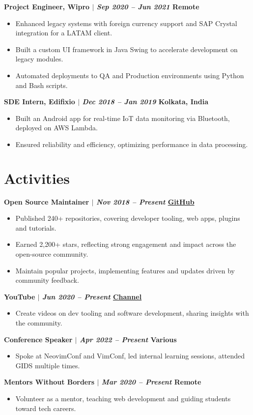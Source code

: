 \documentclass[11pt]{article} %
\newcommand{\uthree}[4]{
    {\large
        {\bfseries #1 $|$ \textit{#2} \hfill #3} \par
    }
    \begin{itemize}
        #4
    \end{itemize}
    \par\addvspace{2.5ex}%
}
\begin{document}
\uthree{Project Engineer, Wipro}{Sep 2020 -- Jun 2021}{Remote}{
  \item Enhanced legacy systems with foreign currency support and SAP Crystal integration for a LATAM client.
  \item Built a custom UI framework in Java Swing to accelerate development on legacy modules.
  \item Automated deployments to QA and Production environments using Python and Bash scripts.
}

\uthree{SDE Intern, Edifixio}{Dec 2018 -- Jan 2019}{Kolkata, India}{
  \item Built an Android app for real-time IoT data monitoring via Bluetooth, deployed on AWS Lambda.
  \item Ensured reliability and efficiency, optimizing performance in data processing.
}

\section{Activities}
\uthree{Open Source Maintainer}{Nov 2018 -- Present}{\href{http://github.com/2kabhishek}{GitHub}}{
  \item Published 240+ repositories, covering developer tooling, web apps, plugins and tutorials.
  \item Earned 2,200+ stars, reflecting strong engagement and impact across the open-source community.
  \item Maintain popular projects, implementing features and updates driven by community feedback.
}

\uthree{YouTube}{Jun 2020 -- Present}{\href{http://youtube.com/@2kabhishek}{Channel}}{
  \item Create videos on dev tooling and software development, sharing insights with the community.
}

\uthree{Conference Speaker}{Apr 2022 -- Present}{Various}{
  \item Spoke at NeovimConf and VimConf, led internal learning sessions, attended GIDS multiple times.
}

\uthree{Mentors Without Borders}{Mar 2020 -- Present}{Remote}{
  \item Volunteer as a mentor, teaching web development and guiding students toward tech careers.
}
\end{document}
